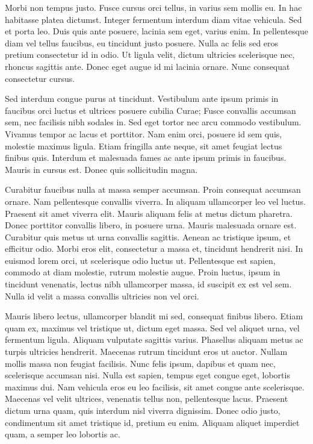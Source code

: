 Morbi non tempus justo. Fusce cursus orci tellus, in varius sem mollis eu. In hac habitasse platea dictumst. Integer fermentum interdum diam vitae vehicula. Sed et porta leo. Duis quis ante posuere, lacinia sem eget, varius enim. In pellentesque diam vel tellus faucibus, eu tincidunt justo posuere. Nulla ac felis sed eros pretium consectetur id in odio. Ut ligula velit, dictum ultricies scelerisque nec, rhoncus sagittis ante. Donec eget augue id mi lacinia ornare. Nunc consequat consectetur cursus.

Sed interdum congue purus at tincidunt. Vestibulum ante ipsum primis in faucibus orci luctus et ultrices posuere cubilia Curae; Fusce convallis accumsan sem, nec facilisis nibh sodales in. Sed eget tortor nec arcu commodo vestibulum. Vivamus tempor ac lacus et porttitor. Nam enim orci, posuere id sem quis, molestie maximus ligula. Etiam fringilla ante neque, sit amet feugiat lectus finibus quis. Interdum et malesuada fames ac ante ipsum primis in faucibus. Mauris in cursus est. Donec quis sollicitudin magna.

Curabitur faucibus nulla at massa semper accumsan. Proin consequat accumsan ornare. Nam pellentesque convallis viverra. In aliquam ullamcorper leo vel luctus. Praesent sit amet viverra elit. Mauris aliquam felis at metus dictum pharetra. Donec porttitor convallis libero, in posuere urna. Mauris malesuada ornare est. Curabitur quis metus ut urna convallis sagittis. Aenean ac tristique ipsum, et efficitur odio. Morbi eros elit, consectetur a massa et, tincidunt hendrerit nisi. In euismod lorem orci, ut scelerisque odio luctus ut. Pellentesque est sapien, commodo at diam molestie, rutrum molestie augue. Proin luctus, ipsum in tincidunt venenatis, lectus nibh ullamcorper massa, id suscipit ex est vel sem. Nulla id velit a massa convallis ultricies non vel orci.

Mauris libero lectus, ullamcorper blandit mi sed, consequat finibus libero. Etiam quam ex, maximus vel tristique ut, dictum eget massa. Sed vel aliquet urna, vel fermentum ligula. Aliquam vulputate sagittis varius. Phasellus aliquam metus ac turpis ultricies hendrerit. Maecenas rutrum tincidunt eros ut auctor. Nullam mollis massa non feugiat facilisis. Nunc felis ipsum, dapibus et quam nec, scelerisque accumsan nisi. Nulla est sapien, tempus eget congue eget, lobortis maximus dui. Nam vehicula eros eu leo facilisis, sit amet congue ante scelerisque. Maecenas vel velit ultrices, venenatis tellus non, pellentesque lacus. Praesent dictum urna quam, quis interdum nisl viverra dignissim. Donec odio justo, condimentum sit amet tristique id, pretium eu enim. Aliquam aliquet imperdiet quam, a semper leo lobortis ac.

